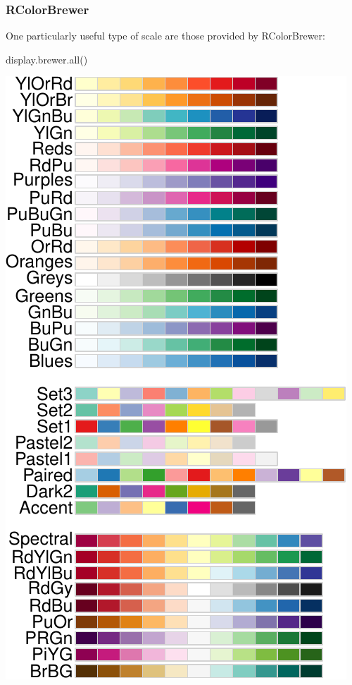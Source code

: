 \documentclass[
]{krantz}
\newenvironment{Shaded}{\begin{snugshade}}{\end{snugshade}}
\newcommand{\FunctionTok}[1]{\textcolor[rgb]{0.00,0.00,0.00}{#1}}
\newcommand{\NormalTok}[1]{#1}
\begin{document}
\hypertarget{rcolorbrewer}{%
\subsubsection{RColorBrewer}\label{rcolorbrewer}}

One particularly useful type of scale are those provided by RColorBrewer:

\begin{Shaded}
\begin{Highlighting}[]
\FunctionTok{display.brewer.all}\NormalTok{()}
\end{Highlighting}
\end{Shaded}

\begin{center}\includegraphics[width=0.8\linewidth]{index_files/figure-latex/unnamed-chunk-61-1} \end{center}
\end{document}
